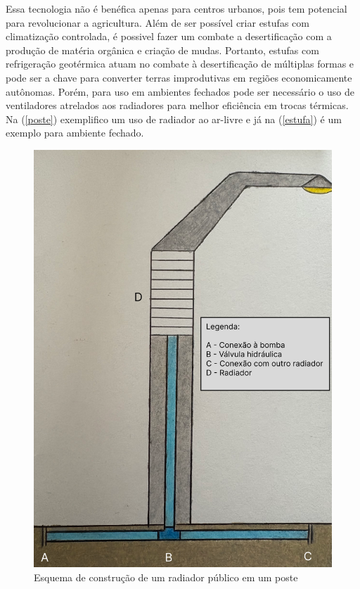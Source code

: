 Essa tecnologia não é benéfica apenas para centros urbanos, pois tem potencial para revolucionar a agricultura. Além de ser possível criar estufas com climatização controlada, é possivel fazer um combate a desertificação com a produção de matéria orgânica e criação de mudas. Portanto, estufas com refrigeração geotérmica atuam no combate à desertificação de múltiplas formas e pode ser a chave para converter terras improdutivas em regiões economicamente autônomas. Porém, para uso em ambientes fechados pode ser necessário o uso de ventiladores atrelados aos radiadores para melhor eficiência em trocas térmicas. Na (\autoref{poste}) exemplifico um uso de radiador ao ar-livre e já na (\autoref{estufa}) é um exemplo para ambiente fechado.

\begin{figure}[htp]
    \centering
    \includegraphics[scale=0.25]{pictures/poste.png}
    \caption{Esquema de construção de um radiador público em um poste}
    \label{poste}
\end{figure}


